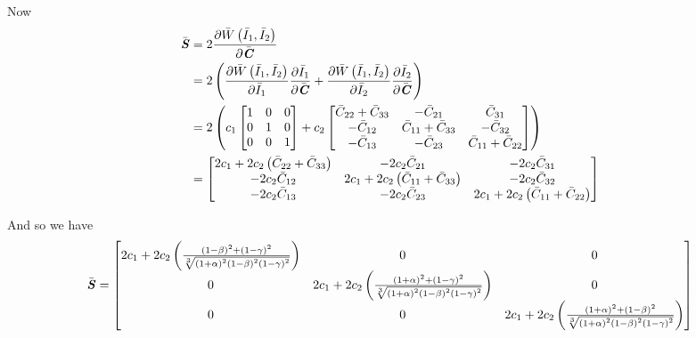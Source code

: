 Now
\begin{equation}
  \begin{split}
    \bar{\boldsymbol{\mathit{S}}}&=2 \dfrac{\partial  \bar{W}\left( \bar{I}_{1},\bar{I}_{2} \right) }{\partial \bar{\boldsymbol{\mathit{C}}}} \\
    &=2\left(  \dfrac{\partial  \bar{W}\left( \bar{I}_{1},\bar{I}_{2} \right) }{\partial \bar{I}_{1}}  \dfrac{\partial \bar{I}_{1}}{\partial \bar{\boldsymbol{\mathit{C}}}} + \dfrac{\partial  \bar{W}\left( \bar{I}_{1},\bar{I}_{2} \right) }{\partial \bar{I}_{2}}  \dfrac{\partial \bar{I}_{2}}{\partial \bar{\boldsymbol{\mathit{C}}}}  \right)\\
    &=2\left( c_{1}\begin{bmatrix}
        1 & 0 & 0 \\
        0 & 1 & 0 \\
        0 & 0 & 1
      \end{bmatrix}+c_{2}\begin{bmatrix}
        \bar{C}_{22}+\bar{C}_{33} & -\bar{C}_{21} & \bar{C}_{31} \\
        -\bar{C}_{12} & \bar{C}_{11}+\bar{C}_{33} & -\bar{C}_{32} \\
        -\bar{C}_{13} & -\bar{C}_{23} & \bar{C}_{11}+\bar{C}_{22}
    \end{bmatrix} \right) \\
    &=\begin{bmatrix}
    2c_{1}+2c_{2}\left( \bar{C}_{22}+\bar{C}_{33} \right) & -2c_{2}\bar{C}_{21} &
    -2c_{2}\bar{C}_{31} \\
    -2c_{2}\bar{C}_{12} & 2c_{1}+2c_{2}\left( \bar{C}_{11}+\bar{C}_{33} \right) & -2c_{2}\bar{C}_{32} \\
    -2c_{2}\bar{C}_{13} & -2c_{2}\bar{C}_{23} & 2c_{1}+2c_{2}\left( \bar{C}_{11}+\bar{C}_{22} \right) 
    \end{bmatrix}
  \end{split}
\end{equation}


And so we have
\begin{equation}
  \bar{\boldsymbol{\mathit{S}}}=\begin{bmatrix}
  2c_{1}+2c_{2}\left( \frac{\left( 1-\beta \right)^{2}+\left( 1-\gamma \right)^{2}}{ \sqrt[3]{\left( 1+\alpha \right)^{2}\left( 1-\beta \right)^{2}\left( 1-\gamma \right)^{2}} } \right) & 0 & 0\\
  0 &
  2c_{1}+2c_{2}\left( \frac{\left( 1+\alpha \right)^{2}+\left( 1-\gamma \right)^{2}}{ \sqrt[3]{\left( 1+\alpha \right)^{2}\left( 1-\beta \right)^{2}\left( 1-\gamma \right)^{2}} } \right)
  & 0 \\
  0 & 0 & 2c_{1}+2c_{2}\left( \frac{\left( 1+\alpha \right)^{2}+\left( 1-\beta \right)^{2}}{ \sqrt[3]{\left( 1+\alpha \right)^{2}\left( 1-\beta \right)^{2}\left( 1-\gamma \right)^{2}} } \right)
  \end{bmatrix} 
\end{equation}


